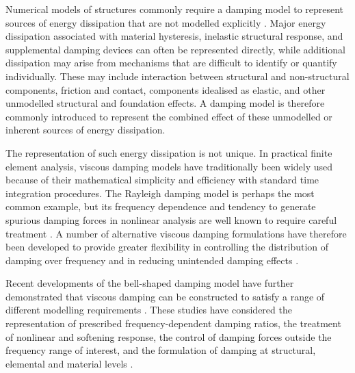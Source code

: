 Numerical models of structures commonly require a damping model to represent sources of energy dissipation that are not modelled explicitly \citep{PEER-ATC:2010:Modeling, Deierlein:et:al:2010:NLStructAnalysis}.
Major energy dissipation associated with material hysteresis, inelastic structural response, and supplemental damping devices can often be represented directly, 
while additional dissipation may arise from mechanisms that are difficult to identify or quantify individually. 
These may include interaction between structural and non-structural components, friction and contact, components idealised as elastic, and other unmodelled structural and foundation effects. 
A damping model is therefore commonly introduced to represent the combined effect of these unmodelled or inherent sources of energy dissipation.

The representation of such energy dissipation is not unique. 
In practical finite element analysis, viscous damping models have traditionally been widely used because of their mathematical simplicity and efficiency with standard time integration procedures. 
The Rayleigh damping model \citep{Rayleigh:1896:Sound} is perhaps the most common example, but its frequency dependence and tendency to generate spurious damping forces in nonlinear analysis are well known to require careful treatment \citep{Chrisp:80:Damping, Shing:Mahin:87:SpuriousDamping, Leger:Dussault:92:Dissipation, Bernal:94:Damping, Carr:97:Damping, Hall:06:RayleighProblems, Carr:07:RUAUMOKO, Charney:08:UnintendedRayleigh, Jehel:et:al:14:RayleighInitialTangent, Chopra:McKenna:16:Damping, Luco:Lanzi:19:SpuriousForce, Lee:20:MatchingDampingRatio}.
A number of alternative viscous damping formulations have therefore been developed to provide greater flexibility in controlling the distribution of damping over frequency and in reducing unintended damping effects \citep{Lee:22:SofteningResponse, Lee:et:al:23:ConsistentElemental}.

Recent developments of the bell-shaped damping model have further demonstrated that viscous damping can be constructed to satisfy a range of different modelling requirements \citep{Lee:19:CompDynDamping, Lee:20:MatchingDampingRatio, Lee:20:SparseDampingModel, Lee:21:AdjustableBW, Lee:22:SofteningResponse}.
These studies have considered the representation of prescribed frequency-dependent damping ratios, the treatment of nonlinear and softening response, the control of damping forces outside the frequency range of interest, and the formulation of damping at structural, elemental and material levels \citep{Lee:et:al:23:ConsistentElemental, Lee:24:Nodycon, Lee:24:WCEE18StateDamping}.

